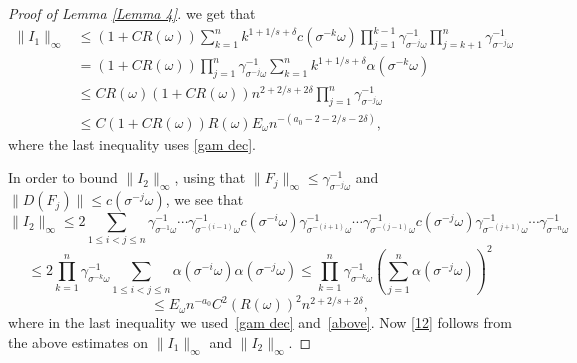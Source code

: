 \documentclass[11pt,reqno,a4paper]{article}
\theoremstyle{special}
\def\om{\omega}
\begin{document}
\begin{proof}[Proof of Lemma \ref{Lemma 4}]
 we get that 
\[
\begin{split}
\|I_1\|_\infty &\leq (1+CR(\om))\sum_{k=1}^n k^{1+1/s+\delta}c(\sigma^{-k}\om)\prod_{j=1}^{k-1}\gamma_{\sigma^{-j}\om}^{-1}\prod_{j=k+1}^{n}\gamma_{\sigma^{-j}\om}^{-1} \\
&=(1+CR(\om))\prod_{j=1}^{n}\gamma_{\sigma^{-j}\om}^{-1}\sum_{k=1}^nk^{1+1/s+\delta}\alpha(\sigma^{-k}\om) \\
&\leq  
C R(\om)(1+CR(\om))n^{2+2/s+2\delta}\prod_{j=1}^n\gamma_{\sigma^{-j}\om}^{-1} \\
&\leq C(1+CR(\om))R(\om)E_\om n^{-(a_0-2-2/s-2\delta)},
 \end{split}
\]
 where  the last inequality  uses \eqref{gam dec}. 
 

In order to bound $\|I_2\|_\infty$, using that $\|F_j\|_\infty\leq \gamma_{\sigma^{-j}\om}^{-1}$ and $\|D(F_j)\|\leq c(\sigma^{-j}\om)$, we see that
  $$
\|I_2\|_\infty\leq 2\sum_{1\leq i<j\leq n}\gamma_{\sigma^{-1}\om}^{-1}\cdots \gamma_{\sigma^{-(i-1)}\om}^{-1}  c(\sigma^{-i}\om)\gamma_{\sigma^{-(i+1)}\om}^{-1}\cdots \gamma_{\sigma^{-(j-1)}\om}^{-1}c(\sigma^{-j}\om)\gamma_{\sigma^{-(j+1)}\om}^{-1}\cdots \gamma_{\sigma^{-n}\omega}^{-1}
$$
$$
\leq 2\prod_{k=1}^n\gamma_{\sigma^{-k}\om}^{-1} \sum_{1\leq i<j\leq n}\alpha(\sigma^{-i}\om)\alpha(\sigma^{-j}\om)\leq \prod_{k=1}^n\gamma_{\sigma^{-k}\om}^{-1}\left(\sum_{j=1}^n \alpha(\sigma^{-j}\om)\right)^2 
  $$
  $$
\leq E_\om n^{-a_0}C^2(R(\om))^2n^{2+2/s+2\delta},
  $$
  where in the last inequality we used~\eqref{gam dec} and~\eqref{above}. 
Now \eqref{12} follows from the above estimates on $\|I_1\|_\infty$ and $\|I_2\|_\infty$.


\end{proof}
\end{document}
